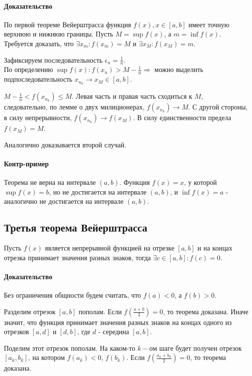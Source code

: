 \documentclass[10pt]{article}
\begin{document}
		\paragraph{Доказательство}
		По первой теореме Вейерштрасса функция $f(x), x \in [a, b]$ имеет точную верхнюю и нижнюю границы. Пусть $M = \sup f(x)$, а $m = \inf f(x)$. Требуется доказать, что $\exists x_m : f(x_m) = M$ и $\exists x_M : f(x_M) = m$.
		
		Зафиксируем последовательность $\epsilon_n = \frac{1}{n}$. \\
		По определению $\sup f(x) : f(x_n) > M - \frac{1}{n} \Rightarrow$ можно выделить подпоследовательность $x_{n_k} \to x_M \in [a, b]$.
		
		$M - \frac{1}{n} < f(x_{n_k}) \leq M$. Левая часть и правая часть сходиться к $M$, следовательно, по лемме о двух милиционерах, $f(x_{n_k}) \to M$. С другой стороны, в силу непрерывности, $f(x_{n_k}) \to f(x_M)$. В силу единственности предела $f(x_M) = M$. 
		
		Аналогично доказывается второй случай.
		
		\paragraph{Контр-пример}
		Теорема не верна на интервале $(a, b)$. Функция $f(x) = x$, у которой $\sup f(x) = b$, но не достигается на интервале $(a, b)$, и $\inf f(x) = a$ - аналогично не достигается на интервале $(a, b)$.
		\subsection{Третья теорема Вейерштрасса}
		Пусть $f(x)$  является непрерывной функцией на отрезке $[a,b]$ и на концах отрезка принимает значения разных знаков, тогда $\exists c \in [a,b] : f(c) = 0$.
		\paragraph{Доказательство}
		Без ограничения общности будем считать, что $f(a) < 0$, а $f(b) > 0$.
		
		Разделим отрезок $[a,b]$ пополам. Если $f(\frac{a+b}{2}) = 0$, то теорема доказана. Иначе значит, что функция принимает значения разных знаков на концах одного из отрезков $[a,d]$ и $[d,b]$, где $d$ - середина $[a,b]$.
		
		Поделим этот отрезок пополам. На каком-то $k-ом$ шаге будет получен отрезок $[a_k, b_k]$, на котором $f(a_k) < 0$, $f(b_k)$. Если $f(\frac{a_k + b_k}{2}) = 0$, то теорема доказана. 
		
\end{document}
